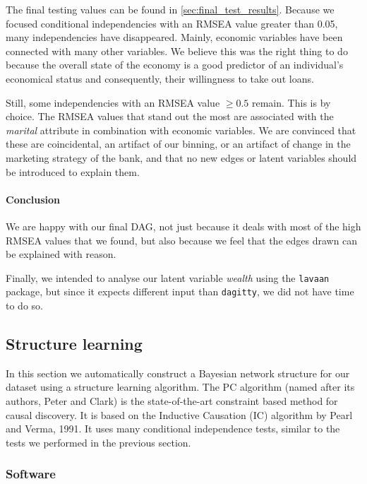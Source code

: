 \documentclass[11pt,]{article}
\let\oldparagraph\paragraph
\renewcommand{\paragraph}[1]{\oldparagraph{#1}\mbox{}}
\begin{document}
\begin{multicols}{2}
The final testing values can be found in
\autoref{sec:final_test_results}. Because we focused conditional
independencies with an RMSEA value greater than 0.05, many
independencies have disappeared. Mainly, economic variables have been
connected with many other variables. We believe this was the right thing
to do because the overall state of the economy is a good predictor of an
individual's economical status and consequently, their willingness to
take out loans.

Still, some independencies with an RMSEA value \(\ge 0.5\) remain. This
is by choice. The RMSEA values that stand out the most are associated
with the \textit{marital} attribute in combination with economic
variables. We are convinced that these are coincidental, an artifact of
our binning, or an artifact of change in the marketing strategy of the
bank, and that no new edges or latent variables should be introduced to
explain them.

\hypertarget{conclusion}{%
\paragraph{Conclusion}\label{conclusion}}

We are happy with our final DAG, not just because it deals with most of
the high RMSEA values that we found, but also because we feel that the
edges drawn can be explained with reason.

Finally, we intended to analyse our latent variable \textit{wealth}
using the \texttt{lavaan} package, but since it expects different input
than \texttt{dagitty}, we did not have time to do so.

\hypertarget{structure-learning}{%
\subsection{Structure learning}\label{structure-learning}}

In this section we automatically construct a Bayesian network structure
for our dataset using a structure learning algorithm. The PC algorithm
(named after its authors, Peter and Clark) is the state-of-the-art
constraint based method for causal discovery. It is based on the
Inductive Causation (IC) algorithm by Pearl and Verma, 1991. It uses
many conditional independence tests, similar to the tests we performed
in the previous section.

\hypertarget{software}{%
\subsubsection{Software}\label{software}}


\end{multicols}
\end{document}
